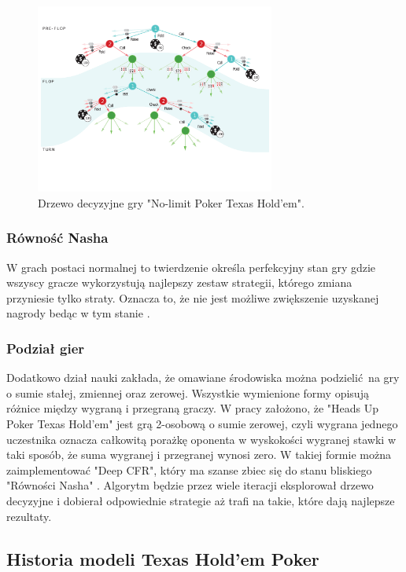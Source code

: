 \documentclass[12pt,oneside,a4paper]{report}
\begin{document}
\begin{figure}[h!]
  \centering
  \includegraphics[width=0.7\textwidth]{./img/tree1.pdf}
  \caption{Drzewo decyzyjne gry "No-limit Poker Texas Hold'em". \cite{ds}}
\end{figure}


\subsubsection{Równość Nasha}

W grach postaci normalnej \cite{n} to twierdzenie określa perfekcyjny stan gry gdzie wszyscy gracze wykorzystują najlepszy
zestaw strategii, którego zmiana przyniesie tylko straty. Oznacza to, że nie jest możliwe
zwiększenie uzyskanej nagrody bedąc w tym stanie \cite{gt}.

\subsubsection{Podział gier}

Dodatkowo dział nauki zakłada, że omawiane środowiska można podzielić na gry o sumie stałej, 
zmiennej oraz zerowej. Wszystkie wymienione formy opisują różnice między wygraną i przegraną 
graczy. W pracy założono, że "Heads Up Poker Texas Hold'em" jest grą
2-osobową o sumie zerowej, czyli wygrana jednego
uczestnika oznacza całkowitą porażkę oponenta w wyskokości wygranej stawki w taki sposób, że suma 
wygranej i przegranej wynosi zero. W takiej formie można
zaimplementować "Deep CFR", który ma szanse zbiec się do stanu bliskiego "Równości Nasha" \cite{dcfr}.
Algorytm będzie przez wiele iteracji eksplorował drzewo decyzyjne i dobierał odpowiednie 
strategie aż trafi na takie, które dają najlepsze rezultaty.


\subsection{Historia modeli Texas Hold'em Poker}
\end{document}
